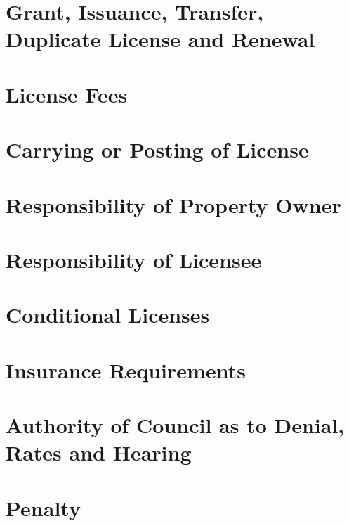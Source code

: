 \documentclass[code.tex]{subfiles}
\begin{document}
\section{Grant, Issuance, Transfer, Duplicate License and Renewal}


\section{License Fees}


\section{Carrying or Posting of License}


\section{Responsibility of Property Owner}


\section{Responsibility of Licensee}


\section{Conditional Licenses}


\section{Insurance Requirements}


\section{Authority of Council as to Denial, Rates and Hearing}


\setcounter{section}{98}
\section{Penalty}
\end{document}
